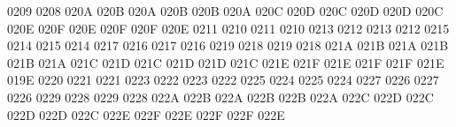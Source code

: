  0209 0208 %
\setcclcucx 020A 020B 020A %
\setcclcucx 020B 020B 020A %
\setcclcucx 020C 020D 020C %
\setcclcucx 020D 020D 020C %
\setcclcucx 020E 020F 020E %
\setcclcucx 020F 020F 020E %
 0211 0210 %
 0211 0210 %
 0213 0212 %
 0213 0212 %
 0215 0214 %
 0215 0214 %
 0217 0216 %
 0217 0216 %
 0219 0218 %
 0219 0218 %
\setcclcucx 021A 021B 021A %
\setcclcucx 021B 021B 021A %
\setcclcucx 021C 021D 021C %
\setcclcucx 021D 021D 021C %
\setcclcucx 021E 021F 021E %
\setcclcucx 021F 021F 021E %
 019E 0220 %
 0221 0221 %
 0223 0222 %
 0223 0222 %
 0225 0224 %
 0225 0224 %
 0227 0226 %
 0227 0226 %
 0229 0228 %
 0229 0228 %
\setcclcucx 022A 022B 022A %
\setcclcucx 022B 022B 022A %
\setcclcucx 022C 022D 022C %
\setcclcucx 022D 022D 022C %
\setcclcucx 022E 022F 022E %
\setcclcucx 022F 022F 022E %
